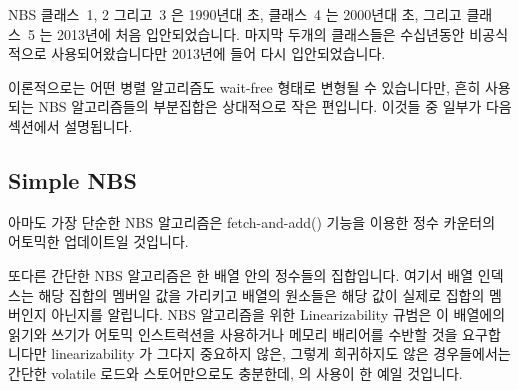 NBS 클래스~1, 2 그리고~3 은 1990년대 초, 클래스~4 는 2000년대 초, 그리고
클래스~5 는 2013년에 처음 입안되었습니다.
마지막 두개의 클래스들은 수십년동안 비공식적으로 사용되어왔습니다만 2013년에
들어 다시 입안되었습니다.

이론적으로는 어떤 병렬 알고리즘도 wait-free 형태로 변형될 수 있습니다만, 흔히
사용되는 NBS 알고리즘들의 부분집합은 상대적으로 작은 편입니다.
이것들 중 일부가 다음 섹션에서 설명됩니다.
\iffalse

NBS classes~1, 2 and~3 were first formulated in the early 1990s,
class~4 was first formulated in the early 2000s,
and class~5 was first formulated in 2013.
The final two classes have seen informal use for a great many decades,
but were reformulated in 2013.

In theory, any parallel algorithm can be cast into wait-free form,
but there are a relatively small subset of NBS algorithms that are
in common use.
A few of these are listed in the following section.
\fi

\subsection{Simple NBS}
\label{sec:advsync:Simple NBS}

아마도 가장 단순한 NBS 알고리즘은 fetch-and-add()
기능을 이용한 정수 카운터의 어토믹한 업데이트일 것입니다.

또다른 간단한 NBS 알고리즘은 한 배열 안의 정수들의 집합입니다.
여기서 배열 인덱스는 해당 집합의 멤버일 값을 가리키고 배열의 원소들은 해당 값이
실제로 집합의 멤버인지 아닌지를 알립니다.
NBS 알고리즘을 위한 Linearizability 규범은 이 배열에의 읽기와 쓰기가 어토믹
인스트럭션을 사용하거나 메모리 배리어를 수반할 것을 요구합니다만
linearizability 가 그다지 중요하지 않은, 그렇게 희귀하지도 않은 경우들에서는
간단한 volatile 로드와 스토어만으로도 충분한데,  의 사용이 한
예일 것입니다.
\iffalse

Perhaps the simplest NBS algorithm is atomic update of an integer
counter using fetch-and-add (\co{atomic_add_return()}) primitives.

Another simple NBS algorithm implements a set of integers in an array.
Here the array index indicates a value that might be a member of the set
and the array element indicates whether or not that value actually is
a set member.
The linearizability criterion for NBS algorithms requires that reads from
and updates to the array either use atomic instructions or be accompanied
by memory barriers, but in the not-uncommon case where linearizability
is not important, simple volatile loads and stores suffice, for example,
using \co{ACCESS_ONCE()}.
\fi

